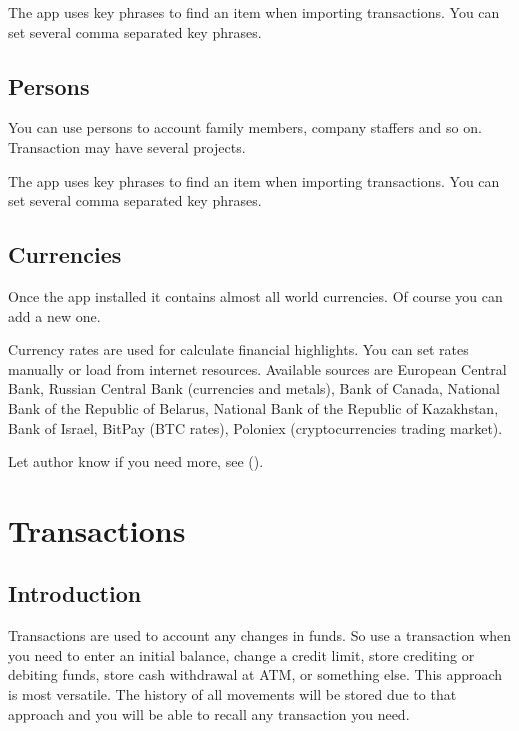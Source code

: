 \documentclass[a4paper,10pt,english]{sphinxmanual}
\begin{document}
\sphinxAtStartPar
The app uses key phrases to find an item when importing transactions. You can set several
comma separated key phrases.


\section{Persons}
\label{\detokenize{directories:persons}}
\sphinxAtStartPar
You can use persons to account family members, company staffers and so on.
Transaction may have several projects.

\sphinxAtStartPar
The app uses key phrases to find an item when importing transactions. You can set several
comma separated key phrases.

\noindent{}
\noindent{}
\noindent{}


\section{Currencies}
\label{\detokenize{directories:currencies}}
\sphinxAtStartPar
Once the app installed it contains almost all world currencies. Of course you can add a new one.

\sphinxAtStartPar
Currency rates are used for calculate financial highlights. You can set rates manually
or load from internet resources. Available sources are European Central Bank,
Russian Central Bank (currencies and metals), Bank of Canada, National Bank of the Republic of Belarus,
National Bank of the Republic of Kazakhstan, Bank of Israel, BitPay (BTC rates), Poloniex (cryptocurrencies trading market).

\sphinxAtStartPar
Let author know if you need more, see {\hyperref[\detokenize{preface:section-feedback}]{}} ().

\sphinxstepscope


\chapter{Transactions}
\label{\detokenize{transactions:transactions}}\label{\detokenize{transactions:chapter-transactions}}\label{\detokenize{transactions::doc}}

\section{Introduction}
\label{\detokenize{transactions:introduction}}
\sphinxAtStartPar
Transactions are used to account any changes in funds. So use a transaction when you need to
enter an initial balance, change a credit limit, store crediting or debiting funds,
store cash withdrawal at ATM, or something else. This approach is most versatile. The history of
all movements will be stored due to that approach and you will be able to recall any transaction
you need.
\end{document}
